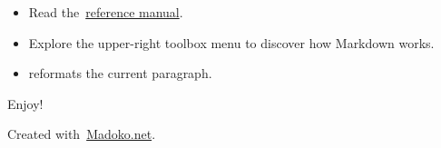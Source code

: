 \documentclass{article}
\begin{document}
\begin{itemize}[noitemsep,topsep=\mdcompacttopsep]%

\item{}Read the~\href{http://research.microsoft.com/en-us/um/people/daan/madoko/doc/reference.html}{reference manual}.%

\item{}Explore the upper-right toolbox menu to discover how Markdown works.%

\item{} reformats the current paragraph.%
\end{itemize}%

\noindent{}Enjoy!%

\begin{mdbmargintb}{4em}{}%
\begin{mdflushright}%
{\tiny{}Created with~\href{https://www.madoko.net}{Madoko.net}.}%
\end{mdflushright}%
\end{mdbmargintb}%
\end{document}
